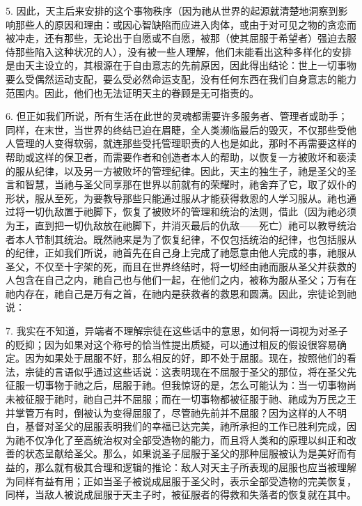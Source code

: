 5. 因此，天主后来安排的这个事物秩序（因为祂从世界的起源就清楚地洞察到影响那些人的原因和理由：或因心智缺陷而应进入肉体，或由于对可见之物的贪恋而被冲走，还有那些，无论出于自愿或不自愿，被那（使其屈服于希望者）强迫去服侍那些陷入这种状况的人），没有被一些人理解，他们未能看出这种多样化的安排是由天主设立的，其根源在于自由意志的先前原因，因此得出结论：世上一切事物要么受偶然运动支配，要么受必然命运支配，没有任何东西在我们自身意志的能力范围内。因此，他们也无法证明天主的眷顾是无可指责的。\par

6. 但正如我们所说，所有生活在此世的灵魂都需要许多服务者、管理者或助手；同样，在末世，当世界的终结已迫在眉睫，全人类濒临最后的毁灭，不仅那些受他人管理的人变得软弱，就连那些受托管理职责的人也是如此，那时不再需要这样的帮助或这样的保卫者，而需要作者和创造者本人的帮助，以恢复一方被败坏和亵渎的服从纪律，以及另一方被败坏的管理纪律。因此，天主的独生子，祂是圣父的圣言和智慧，当祂与圣父同享那在世界以前就有的荣耀时，祂舍弃了它，取了奴仆的形状，服从至死，为要教导那些只能通过服从才能获得救恩的人学习服从。祂也通过将一切仇敌置于祂脚下，恢复了被败坏的管理和统治的法则，借此（因为祂必须为王，直到把一切仇敌放在祂脚下，并消灭最后的仇敌——死亡）祂可以教导统治者本人节制其统治。既然祂来是为了恢复纪律，不仅包括统治的纪律，也包括服从的纪律，正如我们所说，祂首先在自己身上完成了祂愿意由他人完成的事，祂服从圣父，不仅至十字架的死，而且在世界终结时，将一切经由祂而服从圣父并获救的人包含在自己之内，祂自己也与他们一起，在他们之内，被称为服从圣父；万有在祂内存在，祂自己是万有之首，在祂内是获救者的救恩和圆满。因此，宗徒论到祂说：\par

7. 我实在不知道，异端者不理解宗徒在这些话中的意思，如何将一词视为对圣子的贬抑；因为如果对这个称号的恰当性提出质疑，可以通过相反的假设很容易确定。因为如果处于屈服不好，那么相反的好，即不处于屈服。现在，按照他们的看法，宗徒的言语似乎通过这些话说：这表明现在不屈服于圣父的那位，将在圣父先征服一切事物于祂之后，屈服于祂。但我惊讶的是，怎么可能认为：当一切事物尚未被征服于祂时，祂自己并不屈服；而在一切事物都被征服于祂、祂成为万民之王并掌管万有时，倒被认为变得屈服了，尽管祂先前并不屈服？因为这样的人不明白，基督对圣父的屈服表明我们的幸福已达完美，祂所承担的工作已胜利完成，因为祂不仅净化了至高统治权对全部受造物的能力，而且将人类和的原理以纠正和改善的状态呈献给圣父。那么，如果说圣子屈服于圣父的那种屈服被认为是美好而有益的，那么就有极其合理和逻辑的推论：敌人对天主子所表现的屈服也应当被理解为同样有益有用；正如当圣子被说成屈服于圣父时，表示全部受造物的完美恢复，同样，当敌人被说成屈服于天主子时，被征服者的得救和失落者的恢复就在其中。\par

